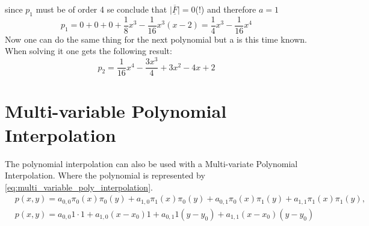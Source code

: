 since $p_1$ must be of order 4 se conclude that $\vert\underline{\overline{F}}\vert=0 $(!) and therefore $a=1$
$$
p_1 = 0+0+0+\frac{1}{8}x^3-\frac{1}{16}x^3(x-2)=\frac{1}{4}x^3-\frac{1}{16}x^4
$$
Now one can do the same thing for the next polynomial but a is this time known.
When solving it one gets the following result:
$$
p_2=\frac{1}{16}x^4-\frac{3x^3}{4}+3x^2-4x+2
$$

\section{Multi-variable Polynomial Interpolation}
The polynomial interpolation can also be used with a Multi-variate Polynomial Interpolation. Where the polynomial is represented by \autoref{eq:multi_variable_poly_interpolation}.
\begin{equation}\label{eq:multi_variable_poly_interpolation}
\begin{aligned}
& p(x, y)=a_{0,0} \pi_0(x) \pi_0(y)+a_{1,0} \pi_1(x) \pi_0(y)+a_{0,1} \pi_0(x) \pi_1(y)+a_{1,1} \pi_1(x) \pi_1(y), \\
& p(x, y)=a_{0,0} 1 \cdot 1+a_{1,0}\left(x-x_0\right) 1+a_{0,1} 1\left(y-y_0\right)+a_{1,1}\left(x-x_0\right)\left(y-y_0\right)
\end{aligned}
\end{equation}

